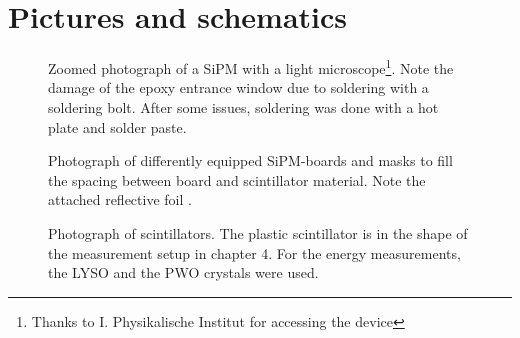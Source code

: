 \newpage

\chapter{Pictures and schematics}\label{ap:C:pictures}

\begin{figure}[h]
	\hfill
	\hfill
	\caption[SiPM under light microscope]{Zoomed photograph of a SiPM with a light microscope\footnote{Thanks to I. Physikalische Institut for accessing the device}. Note the damage of the epoxy entrance window due to soldering with a soldering bolt. After some issues, soldering was done with a hot plate and solder paste.}
	\label{ap:C:SiPM_microscope}
\end{figure}

\begin{figure}[H]
	\hfill
	\hfill
	\caption[SiPM with masks]{Photograph of differently equipped SiPM-boards and masks to fill the spacing between board and scintillator material. Note the attached reflective foil .}
	\label{ap:C:SiPM_masks}
\end{figure}

\newpage

\begin{figure}[h]
	\hfill
	\hfill
	\caption[Various scintillators]{Photograph of scintillators. The plastic scintillator is in the shape of the measurement setup in chapter 4. For the energy measurements, the LYSO and the PWO crystals were used.}
	\label{ap:C:scintillators}
\end{figure}

